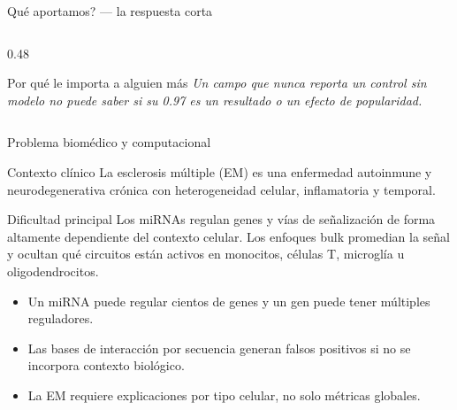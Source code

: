 \begin{frame}{\textquestiondown{}Qu\'e aportamos? --- la respuesta corta}
\begin{columns}[T]
\begin{column}{0.48\textwidth}
{\begin{block}{Por qu\'e le importa a alguien m\'as}
        \vspace{0.25em}
        \emph{Un campo que nunca reporta un control sin modelo no puede saber si su 0.97 es
        un resultado o un efecto de popularidad.}
      \end{block}}

    \end{column}
  \end{columns}
\end{frame}

\begin{frame}{Problema biom\'edico y computacional}
  \begin{block}{Contexto cl\'inico}
    La esclerosis m\'ultiple (EM) es una enfermedad autoinmune y neurodegenerativa cr\'onica con heterogeneidad celular, inflamatoria y temporal.
  \end{block}

  \vspace{0.5em}

  \begin{block}{Dificultad principal}
    Los miRNAs regulan genes y v\'ias de se\~nalizaci\'on de forma altamente dependiente del contexto celular. Los enfoques bulk promedian la se\~nal y ocultan qu\'e circuitos est\'an activos en monocitos, c\'elulas T, microgl\'ia u oligodendrocitos.
  \end{block}

  \vspace{0.5em}

  \begin{itemize}
    \item Un miRNA puede regular cientos de genes y un gen puede tener m\'ultiples reguladores.
    \item Las bases de interacci\'on por secuencia generan falsos positivos si no se incorpora contexto biol\'ogico.
    \item La EM requiere explicaciones por tipo celular, no solo m\'etricas globales.
  \end{itemize}
\end{frame}


